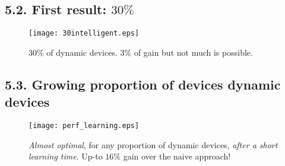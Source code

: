 \subsection{\hfill{}5.2. First result: $30\%$\hfill{}}

\begin{frameO}

    \begin{figure}[h!]
        \centering
        \texttt{[image: 30intelligent.eps]}
        \caption{\small{$30\%$ of dynamic devices.} $3\%$ of gain but not much is possible.}
    \end{figure}

\end{frameO}



\subsection{\hfill{}5.3. Growing proportion of devices dynamic devices\hfill{}}

\begin{frameO}[Dependency on \(D/(S+D)\)]

    \begin{figure}[h!]
        \centering
        \texttt{[image: perf\_learning.eps]}
        \caption{\small{\emph{Almost optimal}, for any proportion of dynamic devices, \emph{after a short learning time}. Up-to $16\%$ gain over the naive approach!}}
    \end{figure}

\end{frameO}
